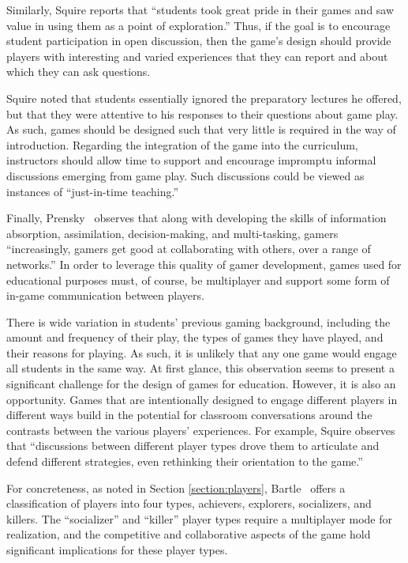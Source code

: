 \documentclass{sig-alternate-05-2015}
\begin{document}
Similarly, Squire reports that ``students took great pride in their games and saw value in using them as a point of exploration.'' Thus, if the goal is to encourage student participation in open discussion, then the game's design should provide players with interesting and varied experiences that they can report and about which they can ask questions.



Squire noted that students essentially ignored the preparatory lectures he offered, but that they were attentive to his responses to their questions about game play. As such, games should be designed such that very little is required in the way of introduction. Regarding the integration of the game into the curriculum, instructors should allow time to support and encourage impromptu informal discussions emerging from game play. Such discussions could be viewed as instances of ``just-in-time teaching.''



Finally, Prensky~\cite{prensky2006don} observes that along with developing the skills of information absorption, assimilation, decision-making, and multi-tasking, gamers ``increasingly, gamers get good at collaborating with others, over a range of networks.'' In order to leverage this quality of gamer development, games used for educational purposes must, of course, be multiplayer and support some form of in-game communication between players.



There is wide variation in students' previous gaming background, including the amount and frequency of their play, the types of games they have played, and their reasons for playing. As such, it is unlikely that any one game would engage all students in the same way. At first glance, this observation seems to present a significant challenge for the design of games for education. However, it is also an opportunity. Games that are intentionally designed to engage different players in different ways build in the potential for classroom conversations around the contrasts between the various players' experiences. For example, Squire observes that ``discussions between different player types drove them to articulate and defend different strategies, even rethinking their orientation to the game.'' 



For concreteness, as noted in Section \ref{section:players}, Bartle~\cite{bartle1996hearts} offers a classification of players into four types, achievers, explorers, socializers, and killers. The ``socializer'' and ``killer'' player types require a multiplayer mode for realization, and the competitive and collaborative aspects of the game hold significant implications for these player types.
\end{document}
